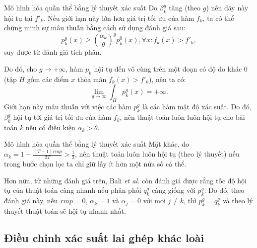 \begin{frame}{Mô hình hóa quần thể bằng lý thuyết xác suất}
  Do \( \beta^{g}_{k} \) tăng (theo \( g \)) nên dãy này hội tụ tại \( f'_{k}
  \). Nếu giới hạn này lớn hơn giá trị tối ưu của hàm \( f_{k} \), ta có thể
  chứng minh sự mâu thuẫn bằng cách sử dụng đánh giá sau:
  \[
    p^{g}_{k}(x) \ge \left( \frac{\alpha_{k}}{\theta} \right) ^{g} p^{0}_{k}(x),
    \forall x: f_{k}(x) > f'_{k}
  ,\] suy được từ đánh giá tích phân.

  Do đó, cho \( g \to +\infty \), hàm \( p_{k} \) hội tụ đến vô cùng trên một
  đoạn có độ đo khác \( 0 \) (tập \( H \) gồm các điểm \( x \) thỏa mãn \(
  f_{k}(x) > f'_{k}\)), nên ta có:
  \[
    \lim_{g \to \infty} \int_{H} p^{g}_{k}(x) = +\infty
  .\] 
  Giới hạn này mâu thuẫn với việc các hàm \( p^{g}_{k} \) là các hàm mật độ xác
  suất. Do đó, \( \beta^{g}_{k} \) hội tụ tới giá trị tối ưu của hàm \(
  f_{k} \), nên thuật toán luôn luôn hội tụ cho bài toán \( k \) nếu có điều
  kiện \( \alpha_{k} > \theta \).
\end{frame}
\begin{frame}{Mô hình hóa quần thể bằng lý thuyết xác suất}
  Mặt khác, do \( \alpha_{k} = 1 - \frac{(T-1)rmp}{2T} > \frac{1}{2} \), nên
  thuật toán luôn luôn hội tụ (theo lý thuyết) nếu trong bước chọn lọc ta chỉ
  giữ lấy ít hơn một nửa số cá thể.

  Hơn nữa, từ những đánh giá trên, Bali \textit{et al.} còn đánh giá được
  rằng tốc độ hội tụ của thuật toán càng nhanh nếu phân phối \( q^{g}_{k} \)
  càng giống với \( p^{g}_{k} \). Do đó, theo đánh giá này, nếu \( rmp = 0
  \), \( \alpha_{k} = 1 \) và \( \alpha_{j} = 0 \) với mọi \( j \neq k \), thì
  \( p^{g}_{k} = q^{g}_{k} \) và theo lý thuyết thuật toán sẽ hội tụ nhanh nhất.
\end{frame}

\subsection{Điều chỉnh xác suất lai ghép khác loài} %
\label{sub:Điều chỉnh xác suất lai ghép khác loài}


